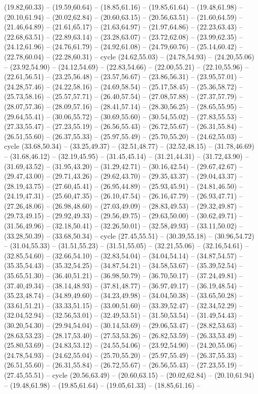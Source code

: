 {(19.82,60.33) -- (19.59,60.64) -- (18.85,61.16) -- (19.85,61.64) -- (19.48,61.98) -- (20.10,61.94) -- (20.02,62.84) -- (20.60,63.15) -- (20.56,63.51) -- (21.60,64.59) -- (21.46,64.89) -- (21.61,65.17) -- (21.63,64.97) -- (21.97,64.86) -- (22.23,63.43) -- (22.68,63.51) -- (22.89,63.14) -- (23.28,63.07) -- (23.72,62.08) -- (23.99,62.35) -- (24.12,61.96) -- (24.76,61.79) -- (24.92,61.08) -- (24.79,60.76) -- (25.14,60.42) -- (22.78,60.04) -- (22.28,60.31) -- cycle (24.62,55.03) -- (24.78,54.93) -- (24.20,55.06) -- (23.92,54.90) -- (24.12,54.69) -- (22.83,54.66) -- (22.00,55.21) -- (22.10,55.96) -- (22.61,56.51) -- (23.25,56.48) -- (23.57,56.67) -- (23.86,56.31) -- (23.95,57.01) -- (24.28,57.46) -- (24.22,58.16) -- (24.69,58.54) -- (25.17,58.45) -- (25.36,58.72) -- (25.73,58.16) -- (25.57,57.71) -- (26.40,57.54) -- (27.08,57.88) -- (27.37,57.79) -- (28.07,57.36) -- (28.09,57.16) -- (28.41,57.14) -- (28.30,56.25) -- (28.65,55.95) -- (29.64,55.41) -- (30.06,55.72) -- (30.69,55.60) -- (30.54,55.02) -- (27.83,55.53) -- (27.33,55.47) -- (27.23,55.19) -- (26.56,55.43) -- (26.72,55.67) -- (26.31,55.84) -- (26.51,55.60) -- (26.37,55.33) -- (25.97,55.49) -- (25.70,55.20) -- (24.62,55.03) -- cycle (33.68,50.34) -- (33.25,49.37) -- (32.51,48.77) -- (32.52,48.15) -- (31.78,46.69) -- (31.68,46.12) -- (32.19,45.95) -- (31.45,45.14) -- (31.21,44.31) -- (31.72,43.90) -- (31.69,43.52) -- (31.95,43.20) -- (31.29,42.71) -- (30.16,42.54) -- (29.67,42.67) -- (29.47,43.00) -- (29.71,43.26) -- (29.62,43.70) -- (29.35,43.37) -- (29.04,43.37) -- (28.19,43.75) -- (27.60,45.41) -- (26.95,44.89) -- (25.93,45.91) -- (24.81,46.50) -- (24.19,47.31) -- (25.60,47.35) -- (26.10,47.54) -- (26.16,47.79) -- (26.93,47.71) -- (27.26,48.06) -- (26.98,48.60) -- (27.03,49.09) -- (28.83,49.53) -- (29.32,49.87) -- (29.73,49.15) -- (29.92,49.33) -- (29.56,49.75) -- (29.63,50.00) -- (30.62,49.71) -- (31.56,49.96) -- (32.18,50.41) -- (32.26,50.01) -- (32.58,49.93) -- (33.11,50.02) -- (33.28,50.39) -- (33.68,50.34) -- cycle (27.45,55.51) -- (30.39,55.18) -- (30.96,54.72) -- (31.04,55.33) -- (31.51,55.23) -- (31.51,55.05) -- (32.21,55.06) -- (32.16,54.61) -- (32.85,54.60) -- (32.66,54.10) -- (32.83,54.04) -- (34.04,54.14) -- (34.87,54.57) -- (35.35,54.43) -- (35.32,54.25) -- (34.87,54.21) -- (34.58,53.67) -- (35.39,52.54) -- (35.65,51.30) -- (36.40,51.21) -- (36.98,50.79) -- (36.70,50.17) -- (37.24,49.81) -- (37.40,49.34) -- (38.14,48.93) -- (37.81,48.77) -- (36.97,49.17) -- (36.19,48.54) -- (35.23,48.74) -- (34.89,49.60) -- (34.23,49.98) -- (34.04,50.38) -- (33.65,50.28) -- (33.61,51.21) -- (33.33,51.15) -- (33.00,51.60) -- (33.39,52.47) -- (32.34,52.29) -- (32.04,52.94) -- (32.56,53.01) -- (32.49,53.51) -- (31.50,53.54) -- (31.49,54.43) -- (30.20,54.30) -- (29.94,54.04) -- (30.14,53.69) -- (29.06,53.47) -- (28.82,53.63) -- (28.63,53.23) -- (28.17,53.40) -- (27.53,53.26) -- (26.82,53.59) -- (26.33,53.49) -- (25.80,53.69) -- (24.83,53.12) -- (24.55,54.06) -- (23.92,54.90) -- (24.20,55.06) -- (24.78,54.93) -- (24.62,55.04) -- (25.70,55.20) -- (25.97,55.49) -- (26.37,55.33) -- (26.51,55.60) -- (26.31,55.84) -- (26.72,55.67) -- (26.56,55.43) -- (27.23,55.19) -- (27.45,55.51) -- cycle (20.56,63.49) -- (20.60,63.15) -- (20.02,62.84) -- (20.10,61.94) -- (19.48,61.98) -- (19.85,61.64) -- (19.05,61.33) -- (18.85,61.16) -- }
